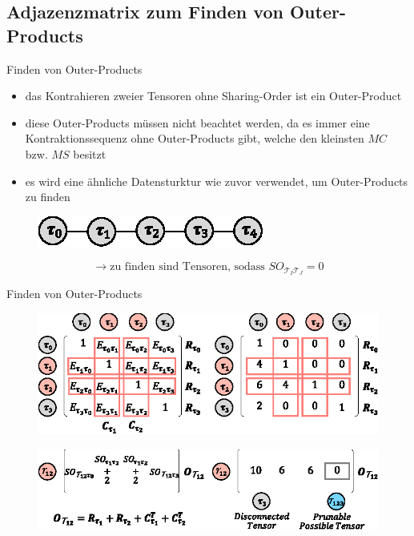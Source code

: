 \documentclass{beamer}
\newcommand{\Tau}{\bm{\mathcal{T}}}
\begin{document}
\subsection{Adjazenzmatrix zum Finden von Outer-Products}
\begin{frame}{Finden von Outer-Products}
	\begin{itemize}
		\item das Kontrahieren zweier Tensoren ohne Sharing-Order ist ein Outer-Product
		\item diese Outer-Products müssen nicht beachtet werden, da es immer eine Kontraktionssequenz ohne Outer-Products gibt, welche den kleinsten $MC$ bzw. $MS$ besitzt\cite{outerProduct}
		\item es wird eine ähnliche Datensturktur wie zuvor verwendet, um Outer-Products zu finden
	\end{itemize}
	\begin{figure}
		\includegraphics{figure_06_a}
	\end{figure} \pause
	\begin{equation*}
		\rightarrow \text{zu finden sind Tensoren, sodass } SO_{\Tau_I \Tau_J} = 0
	\end{equation*}
\end{frame}

\begin{frame}{Finden von Outer-Products}
	\begin{figure}
		\includegraphics[scale=1.1]{figure_05_e_g}
	\end{figure} \pause
	\begin{figure}
		\includegraphics[scale=1.2]{figure_05_f_h}
	\end{figure}
\end{frame}
\end{document}
